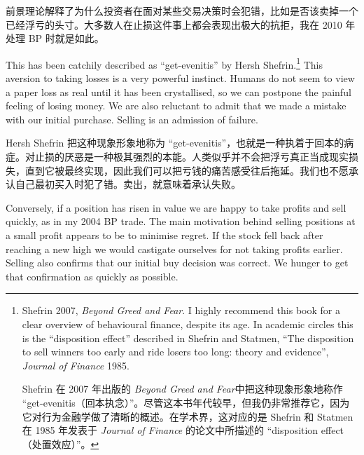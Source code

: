 \begin{chineseblock}前景理论解释了为什么投资者在面对某些交易决策时会犯错，比如是否该卖掉一个已经浮亏的头寸。大多数人在止损这件事上都会表现出极大的抗拒，我在 2010 年处理 BP 时就是如此。\end{chineseblock}

\bipairgap

\begin{englishblock} This has been catchily described as ``get-evenitis'' by Hersh Shefrin.\footnote{Shefrin 2007, \textit{Beyond Greed and Fear}. I highly recommend this book for a clear overview of behavioural finance, despite its age. In academic circles this is the ``disposition effect'' described in Shefrin and Statmen, ``The disposition to sell winners too early and ride losers too long: theory and evidence'', \textit{Journal of Finance} 1985. \par Shefrin 在 2007 年出版的 \textit{Beyond Greed and Fear}中把这种现象形象地称作 “get-evenitis（回本执念）”。尽管这本书年代较早，但我仍非常推荐它，因为它对行为金融学做了清晰的概述。在学术界，这对应的是 Shefrin 和 Statmen 在 1985 年发表于 \textit{Journal of Finance} 的论文中所描述的 “disposition effect（处置效应）”。} This aversion to taking losses is a very powerful instinct. Humans do not seem to view a paper loss as real until it has been crystallised, so we can postpone the painful feeling of losing money. We are also reluctant to admit that we made a mistake with our initial purchase. Selling is an admission of failure. \end{englishblock}

\begin{chineseblock} Hersh Shefrin 把这种现象形象地称为 “get-evenitis”，也就是一种执着于回本的病症。对止损的厌恶是一种极其强烈的本能。人类似乎并不会把浮亏真正当成现实损失，直到它被最终实现，因此我们可以把亏钱的痛苦感受往后拖延。我们也不愿承认自己最初买入时犯了错。卖出，就意味着承认失败。\end{chineseblock}

\bipairgap

\begin{englishblock} Conversely, if a position has risen in value we are happy to take profits and sell quickly, as in my 2004 BP trade. The main motivation behind selling positions at a small profit appears to be to minimise regret. If the stock fell back after reaching a new high we would castigate ourselves for not taking profits earlier. Selling also confirms that our initial buy decision was correct. We hunger to get that confirmation as quickly as possible. \end{englishblock}


